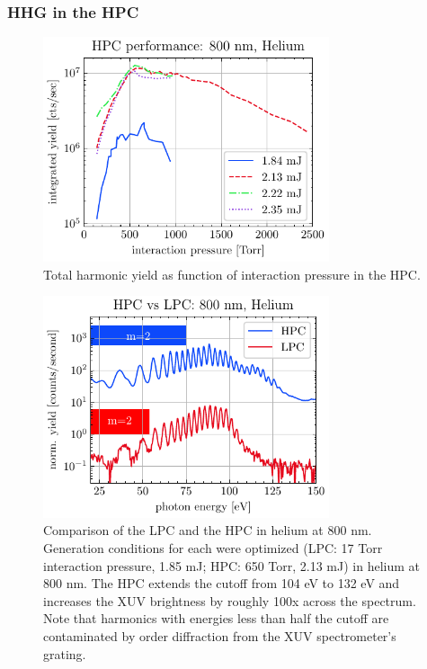 \subsubsection{HHG in the HPC}

\begin{figure}
	\centering
	\includegraphics[width=0.75\textwidth]{figures/chap3/HPC_P_scaling_He800.pdf}
	\caption{Total harmonic yield as function of interaction pressure in the HPC.}
	\label{fig:HPC_performance}
\end{figure}

\begin{figure}
	\centering
	\includegraphics[width=0.75\textwidth]{figures/chap3/HPC_vs_LPC_800He.pdf}
	\caption{Comparison of the LPC and the HPC in helium at 800 nm. Generation conditions for each were optimized (LPC: 17 Torr interaction pressure, 1.85 mJ; HPC: 650 Torr, 2.13 mJ) in helium at 800 nm. The HPC extends the cutoff from 104 eV to 132 eV and increases the XUV brightness by roughly 100x across the spectrum. Note that harmonics with energies less than half the cutoff are contaminated by  order diffraction from the XUV spectrometer's grating.}
	\label{fig:HHG-HPCvsLPCHPC}
\end{figure}

